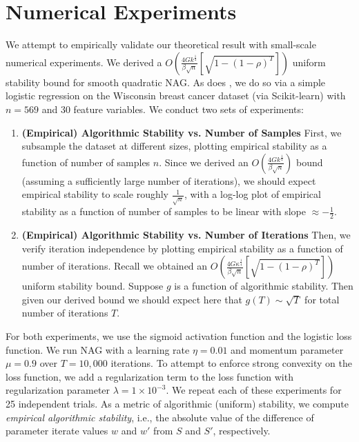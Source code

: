 \documentclass[twoside,11pt]{article}
\begin{document}
\section{Numerical Experiments}

We attempt to empirically validate our theoretical result with small-scale numerical experiments. We derived a $O(\frac{4Gk^{\frac{1}{4}}}{\beta \sqrt{n}}[\sqrt{1-(1-\rho)^T}])$ uniform stability bound for smooth quadratic NAG. As does \cite{CJY18}, we do so via a simple logistic regression on the Wisconsin breast cancer dataset (via Scikit-learn) with $n=569$ and 30 feature variables. We conduct two sets of experiments:

\begin{enumerate}
    \item \textbf{(Empirical) Algorithmic Stability vs. Number of Samples} First, we subsample the dataset at different sizes, plotting empirical stability as a function of number of samples $n$. Since we derived an $O(\frac{4Gk^{\frac{1}{4}}}{\beta \sqrt{n}})$ bound (assuming a sufficiently large number of iterations), we should expect empirical stability to scale roughly $\frac{1}{\sqrt{n}}$, with a log-log plot of empirical stability as a function of number of samples to be linear with slope $\approx - \frac{1}{2}$.

    \item \textbf{(Empirical) Algorithmic Stability vs. Number of Iterations} Then, we verify iteration independence by plotting empirical stability as a function of number of iterations. Recall we obtained an $O(\frac{4G\kappa^{\frac{1}{4}}}{\beta \sqrt{n}}[\sqrt{1-(1-\rho)^T}])$ uniform stability bound. Suppose $g$ is a function of algorithmic stability. Then given our derived bound we should expect here that $g(T) \sim\sqrt{T}$ for total number of iterations $T$.
\end{enumerate}

\noindent
For both experiments, we use the sigmoid activation function and the logistic loss function. We run NAG with a learning rate $\eta = 0.01$ and momentum parameter $\mu = 0.9$ over $T = 10,000$ iterations. To attempt to enforce strong convexity on the loss function, we add a regularization term to the loss function with regularization parameter $\lambda = 1 \times 10^{-3}$. We repeat each of these experiments for 25 independent trials. As a metric of algorithmic (uniform) stability, we compute \textit{empirical algorithmic stability}, i.e., the absolute value of the difference of parameter iterate values $w$ and $w'$ from $S$ and $S'$, respectively.
\end{document}
